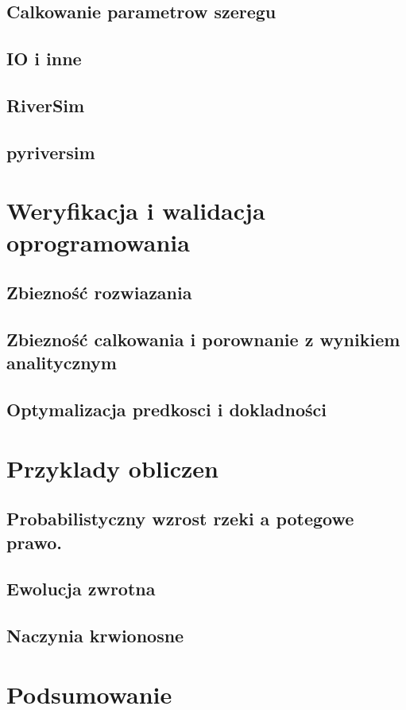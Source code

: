 \documentclass[]{pracamgr}
\begin{document}
    \section{Calkowanie parametrow szeregu}
    \section{IO i inne}
    \section{RiverSim}
    \section{pyriversim}

  \chapter{Weryfikacja i walidacja oprogramowania}
    \section{Zbiezność rozwiazania}
    \section{Zbiezność calkowania i porownanie z wynikiem analitycznym}
    \section{Optymalizacja predkosci i dokladności}



  \chapter{Przyklady obliczen}
    \section{Probabilistyczny wzrost rzeki a potegowe prawo.}
    \section{Ewolucja zwrotna}
    \section{Naczynia krwionosne}

  \chapter{Podsumowanie}
\end{document}
